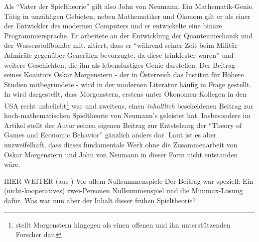 Als "`Vater der Spieltheorie"' gilt also John von Neumann. Ein Mathematik-Genie. Tätig in unzähligen Gebieten, neben Mathematiker und Ökonom gilt er als einer der Entwickler des modernen Computers und er entwickelte eine binäre Programmiersprache. Er arbeitete an der Entwicklung der Quantenmechanik und der Wasserstoffbombe mit. \textcite[S. 232]{Bernstein1996} zitiert, dass er "`während seiner Zeit beim Militär Admiräle gegenüber Generälen bevorzugte, da diese trinkfester waren"' und weitere Geschichten, die ihn als lebenslustiges Genie darstellen. Der Beitrag seines Koautors Oskar Morgenstern - der in Österreich das Institut für Höhere Studien mitbegründete - wird in der modernen Literatur häufig in Frage gestellt. In \textcite[S. 494]{Leonard1994} wird dargestellt, dass Morgenstern, erstens unter Ökonomen-Kollegen in den USA recht unbeliebt\footnote{\textcite[S. 14]{Selten2001} stellt Morgenstern hingegen als einen offenen und ihn unterstützenden Forscher dar.} war und zweitens, einen \textit{inhaltlich} bescheidenen Beitrag zur hoch-mathematischen Spieltheorie von Neumann's geleistet hat. Insbesondere im Artikel \textcite{Morgenstern1976} stellt der Autor seinen eigenen Beitrag zur Entstehung der "`Theory of Games and Economic Behavior"' gänzlich anders dar. Laut \textcite{Nash1994} ist es aber unzweifelhaft, dass dieses fundamentale Werk ohne die Zusammenarbeit von Oskar Morgenstern und John von Neumann in dieser Form nicht entstanden wäre.

HIER WEITER (aus \textcite[S. 6ff]{Selten2001}) Vor allem Nullsummenspiele
Der Beitrag war speziell: Ein (nicht-kooperatives) zwei-Personen Nullsummenspiel und die Minimax-Lösung dafür.
Was war nun aber der Inhalt dieser frühen Spieltheorie?




